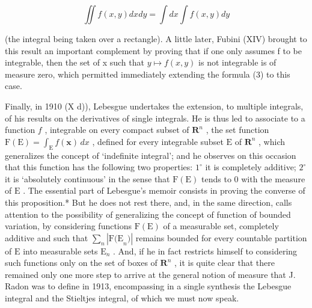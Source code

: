 \[
\iint f (x, y) d x d y = \int d x \int f (x, y) d y\tag{3}
\]

(the integral being taken over a rectangle). A little later, Fubini (XIV) brought to this result an important complement by proving that if one only assumes f to be integrable, then the set of x such that \(y \mapsto f(x, y)\) is not integrable is of measure zero, which permitted immediately extending the formula (3) to this case.

Finally, in 1910 (X d)), Lebesgue undertakes the extension, to multiple integrals, of his results on the derivatives of single integrals. He is thus led to associate to a function \(f\) , integrable on every compact subset of \(\mathbf{R}^n\) , the set function \(\mathrm{F(E)} = \int_{\mathrm{E}} f(\mathbf{x}) \, dx\) , defined for every integrable subset \(\mathrm{E}\) of \(\mathbf{R}^n\) , which generalizes the concept of `indefinite integral'; and he observes on this occasion that this function has the following two properties: \(1^\circ\) it is completely additive; \(2^\circ\) it is `absolutely continuous' in the sense that \(\mathrm{F(E)}\) tends to 0 with the measure of \(\mathrm{E}\) . The essential part of Lebesgue's memoir consists in proving the converse of this proposition.* But he does not rest there, and, in the same direction, calls attention to the possibility of generalizing the concept of function of bounded variation, by considering functions \(\mathrm{F(E)}\) of a measurable set, completely additive and such that \(\sum_{n} |\mathrm{F(E}_{n})|\) remains bounded for every countable partition of \(\mathrm{E}\) into measurable sets \(\mathrm{E}_{n}\) . And, if he in fact restricts himself to considering such functions only on the set of boxes of \(\mathbf{R}^n\) , it is quite clear that there remained only one more step to arrive at the general notion of measure that J. Radon was to define in 1913, encompassing in a single synthesis the Lebesgue integral and the Stieltjes integral, of which we must now speak.

